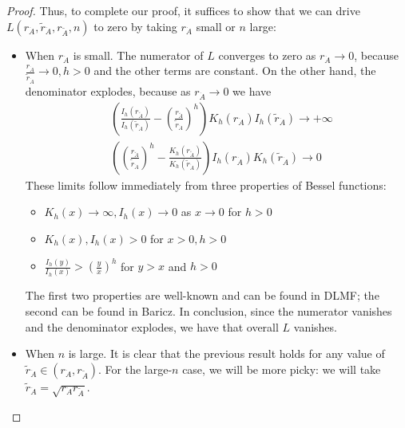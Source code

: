 \documentclass[nofootinbib,english, aip, jcp, priprint, graphicx,floatfix]{revtex4-1}
\theoremstyle{plain}
\theoremstyle{definition}
\theoremstyle{plain}
\begin{document}
\begin{proof}
Thus, to complete our proof, it suffices to show that we can drive $L(r_{\dot A}, \tilde r_{\dot A}, r_{\tilde A},n)$ to zero by taking $r_{\dot A}$ small or $n$ large:
\begin{itemize}
    \item When $r_{\dot A}$ is small.  The numerator of $L$ converges to zero as $r_{\dot A}\rightarrow 0$, because $\frac{r_{\dot A}}{\tilde r_{\dot A}}\rightarrow 0,h>0$ and the other terms are constant.  On the other hand, the denominator explodes, because as $r_{\dot A}\rightarrow0$ we have
    \begin{align*}
    & \left( \frac{I_h ( r_{\tilde{A}})}{I_h ( \tilde r_{\dot A})} - \left(\frac{r_{\tilde{A}}}{\tilde r_{\dot A}} \right)^h  \right)
                K_h ( r_{\dot A}) I_h ( \tilde r_{\dot A}) \rightarrow +\infty \\
    & \left( \left( \frac{r_{\tilde{A}}}{\tilde r_{\dot A}}\right)^h  - \frac{K_h ( r_{\tilde{A}})}{K_h ( \tilde r_{\dot A})} \right) 
                I_h (r_{\dot A})K_h ( \tilde r_{\dot A})\rightarrow 0
    \end{align*}
    These limits follow immediately from three properties of Bessel functions:
    \begin{itemize}
        \item $K_h(x)\rightarrow \infty,I_h(x)\rightarrow 0$ as $x\rightarrow 0$ for $h>0$
        \item $K_h(x),I_h(x)>0$ for $x>0,h>0$
        \item $\frac{I_{h}(y)}{I_{h}(x)} > \left(\frac{y}{x}\right)^{h}$ for $y>x$ and $h>0$
    \end{itemize} 
    The first two properties are well-known and can be found in DLMF\cite{noauthor_undated-ti}; the second can be found in Baricz.\cite{noauthor_undated-ti,baricz2010bounds}  In conclusion, since the numerator vanishes and the denominator explodes, we have that overall $L$ vanishes.  
    \item When $n$ is large.  It is clear that the previous result holds for any value of $\tilde r_{\dot A}\in (r_{\dot A}, r_{\tilde A})$.  For the large-$n$ case, we will be more picky: we will take $\tilde r_{\dot A}=\sqrt{r_{\dot A} r_{\tilde A}}$.  


\end{itemize}
\end{proof}
\end{document}
